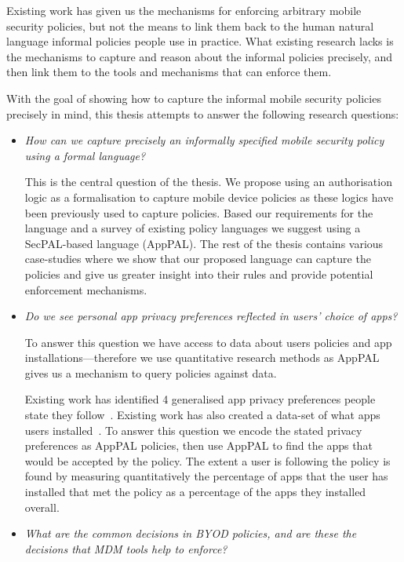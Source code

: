 \documentclass[thesis.tex]{subfiles}
\begin{document}
Existing work has given us the mechanisms for enforcing
arbitrary mobile security policies, but not the means to link them
back to the human natural language informal policies people use in
practice.  What existing research lacks is the mechanisms to capture
and reason about the informal policies precisely, and then link them to
the tools and mechanisms that can enforce them.

With the goal of showing how to capture the informal mobile security
policies precisely in mind, this thesis attempts to answer the
following research questions:

\begin{itemize}
\item \emph{How can we capture precisely an informally specified
    mobile security policy using a formal language?}
  
  This is the central question of the thesis.  We propose using an
  authorisation logic as a formalisation to capture mobile device
  policies as these logics have been previously used to capture
  policies.  Based our requirements for the language and a survey of
  existing policy languages we suggest using a SecPAL-based language
  (AppPAL).  The rest of the thesis contains various case-studies where
  we show that our proposed language can capture the policies and give
  us greater insight into their rules and provide potential enforcement
  mechanisms.
    
\item \emph{Do we see personal app privacy preferences reflected in
    users' choice of apps?}
  
  To answer this question we have access to data about users policies
  and app installations---therefore we use quantitative research methods
  as AppPAL gives us a mechanism to query policies against data.

  Existing work has identified 4 generalised app privacy preferences
  people state they follow~\cite{lin_modeling_2014}.  Existing work has
  also created a data-set of what apps users
  installed~\cite{oliner_carat:_2013}.  To answer this question we
  encode the stated privacy preferences as AppPAL policies, then use
  AppPAL to find the apps that would be accepted by the policy.  The
  extent a user is following the policy is found by measuring
  quantitatively the percentage of apps that the user has installed that
  met the policy as a percentage of the apps they installed overall.

\item \emph{What are the common decisions in \ac{BYOD} policies, and
    are these the decisions that \ac{MDM} tools help to enforce?}


\end{itemize}
\end{document}

